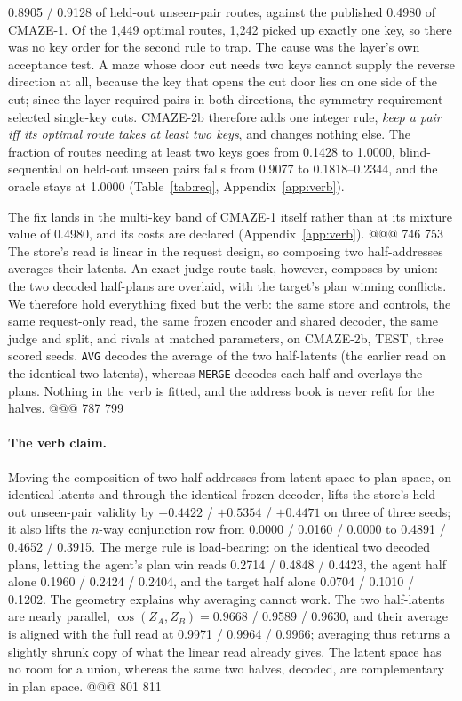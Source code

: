 0.8905 / 0.9128 of held-out unseen-pair routes, against the published 0.4980 of CMAZE-1. Of
the 1,449 optimal routes, 1,242 picked up exactly one key, so there was no key order for the
second rule to trap. %
The cause was the layer's own acceptance test. A maze whose door cut needs two keys cannot
supply the reverse direction at all, because the key that opens the cut door lies on one side
of the cut; since the layer required pairs in both directions, the symmetry requirement selected
single-key cuts. %
CMAZE-2b therefore adds one integer rule, \emph{keep a pair iff its optimal route takes at least
two keys}, and changes nothing else. The fraction of routes needing at least two keys goes from
0.1428 to 1.0000, blind-sequential on held-out unseen pairs falls from 0.9077 to 0.1818--0.2344,
and the oracle stays at 1.0000 (Table~\ref{tab:req}, Appendix~\ref{app:verb}). %

The fix lands in the multi-key band of CMAZE-1 itself rather than at its mixture value of 0.4980, and %
its costs are declared (Appendix~\ref{app:verb}).
@@@ 746 753
The store's read is linear in the request design, so composing two half-addresses averages
their latents. An exact-judge route task, however, composes by union: the two decoded half-plans
are overlaid, with the target's plan winning conflicts. We therefore hold everything fixed but
the verb: the same store and controls, the same request-only read, the same frozen encoder and
shared decoder, the same judge and split, and rivals at matched parameters, on CMAZE-2b, TEST,
three scored seeds. \texttt{AVG} decodes the average of the two half-latents (the earlier read
on the identical two latents), whereas \texttt{MERGE} decodes each half and overlays the plans.
Nothing in the verb is fitted, and the address book is never refit for the halves. %
@@@ 787 799
\paragraph{The verb claim.} Moving the composition of two half-addresses from latent space to
plan space, on identical latents and through the identical frozen decoder, lifts the store's
held-out unseen-pair validity by $+0.4422$ / $+0.5354$ / $+0.4471$ on three of three seeds; it
also lifts the $n$-way conjunction row from 0.0000 / 0.0160 / 0.0000 to 0.4891 / 0.4652 / 0.3915.
The merge rule is load-bearing: on the identical two decoded plans, letting the agent's plan
win reads 0.2714 / 0.4848 / 0.4423, the agent half alone 0.1960 / 0.2424 / 0.2404, and the target
half alone 0.0704 / 0.1010 / 0.1202. %
The geometry explains why averaging cannot work. The two half-latents are nearly parallel,
$\cos(Z_A,Z_B)=0.9668$ / 0.9589 / 0.9630, and their average is aligned with the full read at
0.9971 / 0.9964 / 0.9966; averaging thus returns a slightly shrunk copy of what the linear read
already gives. The latent space has no room for a union, whereas the same two halves, decoded,
are complementary in plan space. %
@@@ 801 811
